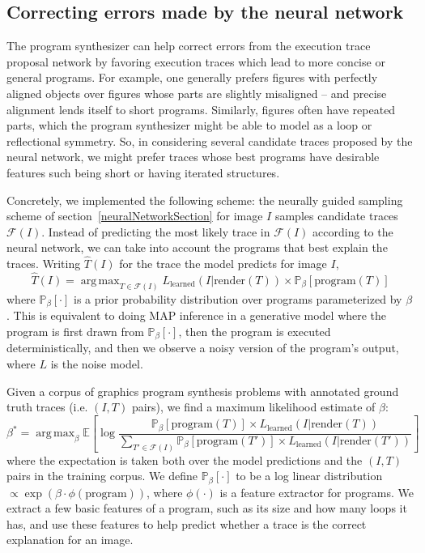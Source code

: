\documentclass{article}
\DeclareMathOperator*{\argmax}{arg\,max} %
\DeclareMathOperator{\argmax}{argmax} %
\newcommand{\expect}{\mathds{E}} %
\newcommand{\probability}{\mathds{P}} %
\begin{document}
\subsection{Correcting errors made by the neural network}\label{synthesizerHelpsParsing}
The program synthesizer can help correct errors from the execution trace proposal network by favoring execution traces which lead to more concise or general programs.
For example, one generally prefers figures with perfectly aligned objects over figures whose parts are slightly misaligned -- and precise alignment lends itself to short programs.
Similarly, figures often have repeated parts,
which the program synthesizer might be able to model as a loop or reflectional symmetry.
So, in considering several candidate traces proposed by the neural network,
we might prefer traces whose best programs have desirable features such being short or having iterated structures.

Concretely, we implemented the following scheme: the neurally guided sampling scheme of section~\ref{neuralNetworkSection} for image $I$ samples candidate traces $\mathcal{F}(I)$.
Instead of predicting the most likely trace in $\mathcal{F}(I)$ according to the neural network,
we can take into account the programs that best explain the traces. 
Writing $\hat{T}(I)$ for the trace the model predicts for image $I$,
\begin{equation}
\hat{T}(I) = \argmax_{T\in \mathcal{F}(I)} L_{\text{learned}}(I | \text{render}(T)) \times\probability_{\beta} [ \text{program}(T)] 
\end{equation}
where $\probability_{\beta} [\cdot]$ is a prior probability
distribution over programs parameterized by $\beta$.
This is equivalent to doing
MAP inference in a generative model where the program is first drawn
from $\probability_{\beta} [\cdot]$, then the program is executed deterministically,
and then we observe a noisy version of the program's output, where $L$
is the noise model.

Given a corpus of graphics program synthesis problems with annotated ground truth traces (i.e. $(I,T)$ pairs),
we find a maximum likelihood estimate of $\beta$:
\begin{equation}
  \beta^* = \argmax_{\beta} \expect \left[ \log \frac{\probability_{\beta} [\text{program}(T)]\times L_{\text{learned}}(I|\text{render}(T))}{\sum_{T'\in \mathcal{F}(I)} \probability_{\beta} [\text{program}(T')]\times L_{\text{learned}}(I|\text{render}(T'))} \right]
\end{equation}
where the expectation is taken both over the model predictions and the
$(I,T)$ pairs in the training corpus.  We define $\probability_{\beta}
[\cdot]$ to be a log linear distribution $\propto \exp
(\beta\cdot \phi(\text{program}))$, where $\phi(\cdot)$ is a feature
extractor for programs.  We extract a few basic features of a
program, such as its size and how many loops it has, and use these
features to help predict whether a trace is the correct explanation
for an image.
\end{document}
